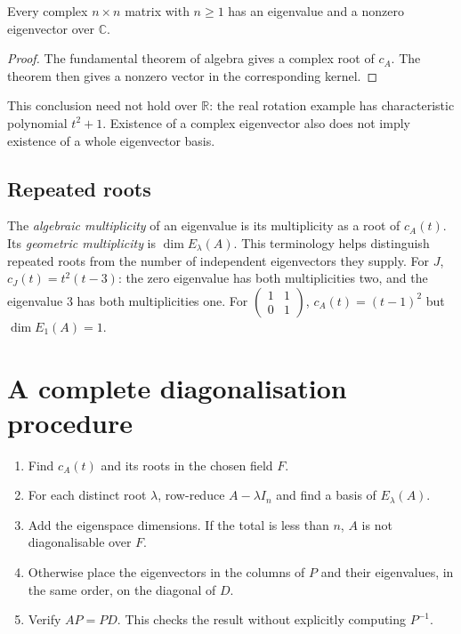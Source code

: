 \begin{corollary}
Every complex $n\times n$ matrix with $n\geq1$ has an eigenvalue and a
nonzero eigenvector over $\mathbb C$.
\end{corollary}
\begin{proof}
The fundamental theorem of algebra gives a complex root of $c_A$.
The theorem then gives a nonzero vector in the corresponding kernel.
\end{proof}

This conclusion need not hold over $\mathbb R$: the real rotation example
has characteristic polynomial $t^2+1$.
Existence of a complex eigenvector also does not imply existence of a
whole eigenvector basis.

\subsection{Repeated roots}

The \emph{algebraic multiplicity} of an eigenvalue is its multiplicity as
a root of $c_A(t)$.
Its \emph{geometric multiplicity} is $\dim E_\lambda(A)$.
This terminology helps distinguish repeated roots from the number of
independent eigenvectors they supply.
For $J$, $c_J(t)=t^2(t-3)$: the zero eigenvalue has both multiplicities
two, and the eigenvalue $3$ has both multiplicities one.
For $\begin{pmatrix}1&1\\0&1\end{pmatrix}$,
$c_A(t)=(t-1)^2$ but $\dim E_1(A)=1$.

\section{A complete diagonalisation procedure}

\begin{enumerate}
\item Find $c_A(t)$ and its roots in the chosen field $F$.
\item For each distinct root $\lambda$, row-reduce $A-\lambda I_n$ and
      find a basis of $E_\lambda(A)$.
\item Add the eigenspace dimensions. If the total is less than $n$,
      $A$ is not diagonalisable over $F$.
\item Otherwise place the eigenvectors in the columns of $P$ and their
      eigenvalues, in the same order, on the diagonal of $D$.
\item Verify $AP=PD$. This checks the result without explicitly computing
      $P^{-1}$.
\end{enumerate}

